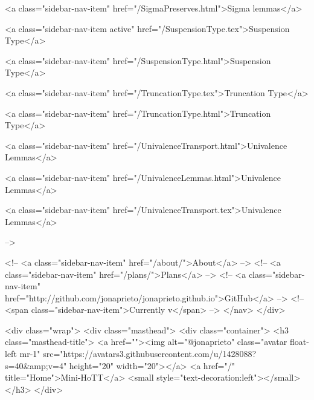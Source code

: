       
    
      
        
          <a class="sidebar-nav-item" href="/SigmaPreserves.html">Sigma lemmas</a>
        
      
    
      
        
          <a class="sidebar-nav-item active" href="/SuspensionType.tex">Suspension Type</a>
        
      
    
      
        
          <a class="sidebar-nav-item" href="/SuspensionType.html">Suspension Type</a>
        
      
    
      
        
          <a class="sidebar-nav-item" href="/TruncationType.tex">Truncation Type</a>
        
      
    
      
        
          <a class="sidebar-nav-item" href="/TruncationType.html">Truncation Type</a>
        
      
    
      
        
          <a class="sidebar-nav-item" href="/UnivalenceTransport.html">Univalence Lemmas</a>
        
      
    
      
        
          <a class="sidebar-nav-item" href="/UnivalenceLemmas.html">Univalence Lemmas</a>
        
      
    
      
        
          <a class="sidebar-nav-item" href="/UnivalenceTransport.tex">Univalence Lemmas</a>
        
      
     -->

    <!-- <a class="sidebar-nav-item" href="/about/">About</a> -->
    <!-- <a class="sidebar-nav-item" href="/plans/">Plans</a> -->
    <!-- <a class="sidebar-nav-item" href="http://github.com/jonaprieto/jonaprieto.github.io">GitHub</a> -->
    <!-- <span class="sidebar-nav-item">Currently v</span> -->
  </nav>
</div>

    <div class="wrap">
      <div class="masthead">
        <div class="container">
          <h3 class="masthead-title">
            <a href=""><img alt="@jonaprieto" class="avatar float-left mr-1" src="https://avatars3.githubusercontent.com/u/1428088?s=40&amp;v=4" height="20" width="20"></a>
            <a href="/" title="Home">Mini-HoTT</a>
            <small style="text-decoration:left"></small>
          </h3>
        </div>
      
